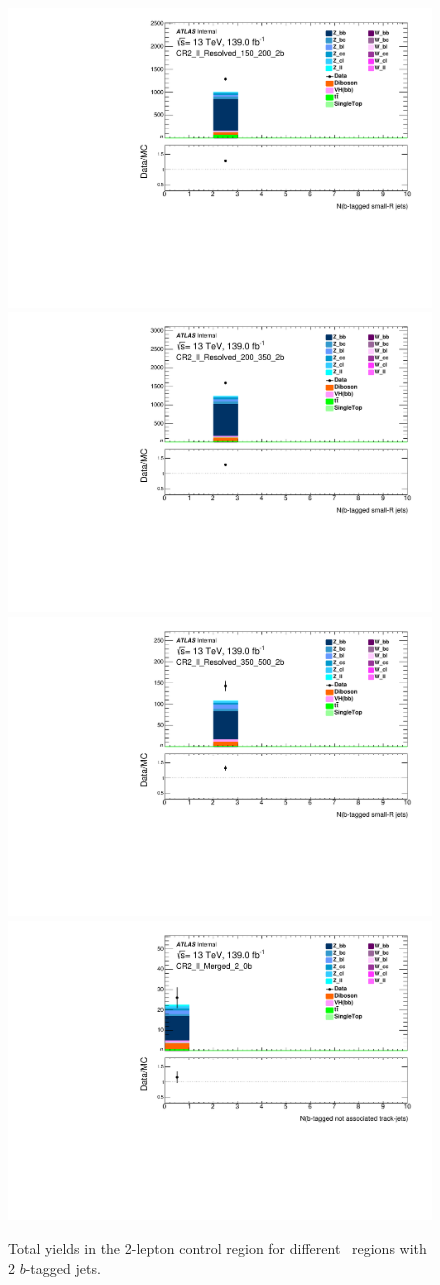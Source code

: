 \begin{figure}[!htb]
    \includegraphics[width=0.46\linewidth]{chapters/c8/figures/2L/DataMC_MonoH_Nominal_CR2_ll_Resolved_150_200_2b_N_BJets_04.pdf}
    \includegraphics[width=0.46\linewidth]{chapters/c8/figures/2L/DataMC_MonoH_Nominal_CR2_ll_Resolved_200_350_2b_N_BJets_04.pdf}\\
    \includegraphics[width=0.46\linewidth]{chapters/c8/figures/2L/DataMC_MonoH_Nominal_CR2_ll_Resolved_350_500_2b_N_BJets_04.pdf}
    \includegraphics[width=0.46\linewidth]{chapters/c8/figures/2L/DataMC_MonoH_Nominal_CR2_ll_Merged_2_0b_N_BTags_not_associated_02.pdf}
    \caption{Total yields in the 2-lepton control region for different \met~regions with 2 $b$-tagged jets.}
    \label{fig:data-mc-2l-ll-nb-2b}
\end{figure}
  
